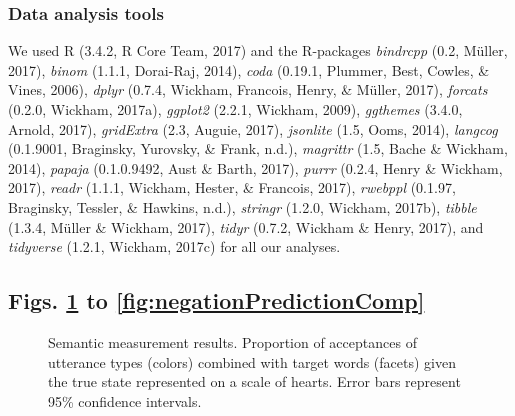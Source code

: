 \documentclass[12pt]{article}
\newcommand{\beginsupplement}{%
        \setcounter{table}{0}
        \renewcommand{\thetable}{S\arabic{table}}%
        \setcounter{figure}{0}
        \renewcommand{\thefigure}{S\arabic{figure}}%
     }
\begin{document}
\subsubsection*{Data analysis tools}

We used R (3.4.2, R Core Team, 2017) and the R-packages \emph{bindrcpp}
(0.2, Müller, 2017), \emph{binom} (1.1.1, Dorai-Raj, 2014), \emph{coda}
(0.19.1, Plummer, Best, Cowles, \& Vines, 2006), \emph{dplyr} (0.7.4,
Wickham, Francois, Henry, \& Müller, 2017), \emph{forcats} (0.2.0,
Wickham, 2017a), \emph{ggplot2} (2.2.1, Wickham, 2009), \emph{ggthemes}
(3.4.0, Arnold, 2017), \emph{gridExtra} (2.3, Auguie, 2017),
\emph{jsonlite} (1.5, Ooms, 2014), \emph{langcog} (0.1.9001, Braginsky,
Yurovsky, \& Frank, n.d.), \emph{magrittr} (1.5, Bache \& Wickham,
2014), \emph{papaja} (0.1.0.9492, Aust \& Barth, 2017), \emph{purrr}
(0.2.4, Henry \& Wickham, 2017), \emph{readr} (1.1.1, Wickham, Hester,
\& Francois, 2017), \emph{rwebppl} (0.1.97, Braginsky, Tessler, \&
Hawkins, n.d.), \emph{stringr} (1.2.0, Wickham, 2017b), \emph{tibble}
(1.3.4, Müller \& Wickham, 2017), \emph{tidyr} (0.7.2, Wickham \& Henry,
2017), and \emph{tidyverse} (1.2.1, Wickham, 2017c) for all our
analyses.


\subsection*{Figs. \ref{fig:litSem} to \ref{fig:negationPredictionComp}}

\setcounter{figure}{0}    
\beginsupplement

\begin{figure}[h]
\centering
\caption{\label{fig:litSem}Semantic measurement results. Proportion of
acceptances of utterance types (colors) combined with target words
(facets) given the true state represented on a scale of hearts. Error
bars represent 95\% confidence intervals.}
\end{figure}
\end{document}
